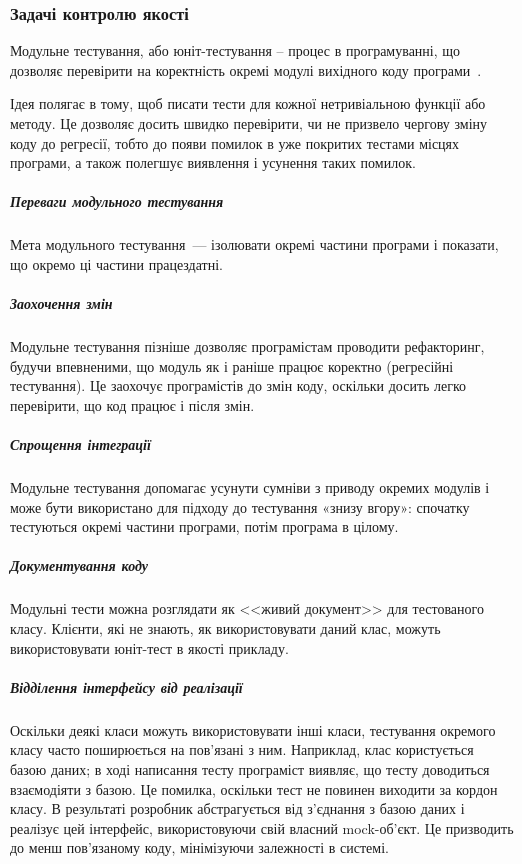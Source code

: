 \subsubsection{Задачі контролю якості}

Модульне тестування, або юніт-тестування -- процес в програмуванні, що дозволяє перевірити на коректність окремі модулі вихідного коду програми~\cite{бородіна2018selenium}.

Ідея полягає в тому, щоб писати тести для кожної нетривіальною функції або методу. Це дозволяє досить швидко перевірити, чи не призвело чергову зміну коду до регресії, тобто до появи помилок в уже покритих тестами місцях програми, а також полегшує виявлення і усунення таких помилок.

\subparagraph{Переваги модульного тестування}

Мета модульного тестування~--- ізолювати окремі частини програми і показати, що окремо ці частини працездатні.

\subparagraph{Заохочення змін}

Модульне тестування пізніше дозволяє програмістам проводити рефакторинг, будучи впевненими, що модуль як і раніше працює коректно (регресійні тестування). Це заохочує програмістів до змін коду, оскільки досить легко перевірити, що код працює і після змін.

\subparagraph{Спрощення інтеграції}
Модульне тестування допомагає усунути сумніви з приводу окремих модулів і може бути використано для підходу до тестування «знизу вгору»: спочатку тестуються окремі частини програми, потім програма в цілому.

\subparagraph{Документування коду}

Модульні тести можна розглядати як <<живий документ>> для тестованого класу. Клієнти, які не знають, як використовувати даний клас, можуть використовувати юніт-тест в якості прикладу.

\subparagraph{Відділення інтерфейсу від реалізації}

Оскільки деякі класи можуть використовувати інші класи, тестування окремого класу часто поширюється на пов'язані з ним. Наприклад, клас користується базою даних; в ході написання тесту програміст виявляє, що тесту доводиться взаємодіяти з базою. Це помилка, оскільки тест не повинен виходити за кордон класу. В результаті розробник абстрагується від з'єднання з базою даних і реалізує цей інтерфейс, використовуючи свій власний mock-об'єкт. Це призводить до менш пов'язаному коду, мінімізуючи залежності в системі.


